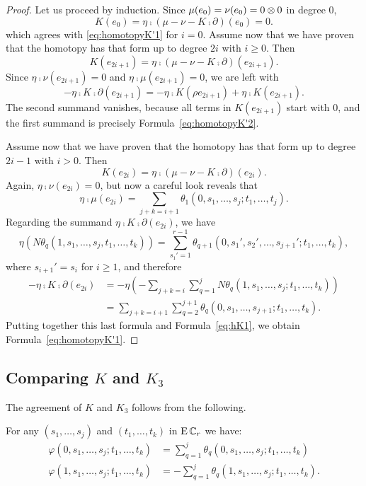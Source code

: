 \begin{proof}
 	Let us proceed by induction.
	Since $\mu(e_0) = \nu(e_0) = 0\otimes 0$ in degree $0$,
	\[
	K(e_0) = \eta \comp (\mu-\nu-K \comp \partial)(e_0) = 0.
	\]
	which agrees with \eqref{eq:homotopyK'1} for $i=0$.
	Assume now that we have proven that the homotopy has that form up to degree $2i$ with $i\geq 0$.
	Then
	\[K(e_{2i+1}) = \eta \comp (\mu-\nu-K \comp \partial)(e_{2i+1}).\]
	Since $\eta \comp \nu(e_{2i+1}) = 0$ and $\eta \comp \mu(e_{2i+1}) = 0$, we are left with
	\[-\eta \comp K \comp \partial(e_{2i+1}) = -\eta \comp K (\rho e_{2i+1}) + \eta \comp K (e_{2i+1}).
	\]
	The second summand vanishes, because all terms in $K(e_{2i+1})$ start with $0$, and the first summand is precisely Formula~\eqref{eq:homotopyK'2}.

	Assume now that we have proven that the homotopy has that form up to degree $2i-1$ with $i>0$.
	Then
	\[K(e_{2i}) = \eta \comp (\mu-\nu-K \comp \partial)(e_{2i}).\]
	Again, $\eta \comp \nu(e_{2i}) = 0$, but now a careful look reveals that
	\begin{equation}\label{eq:hK1}
		\eta \comp \mu(e_{2i}) = \sum_{j+k=i+1}\theta_1(0,s_1,\dots,s_j;t_1,\dots,t_j).
	\end{equation}
	Regarding the summand $\eta \comp K \comp \partial(e_{2i})$, we have
	\[\eta(N\theta_q(1,s_1,\dots,s_j,t_1,\dots,t_k)) = \sum_{s_1' = 1}^{r-1}\theta_{q+1}(0,s_1',s_2',\dots,s_{j+1}';t_1,\dots,t_k),\]
	where $s_{i+1}' = s_i$ for $i\geq 1$, and therefore
	\begin{align*}\label{eq:hK2}
		-\eta \comp K \comp \partial(e_{2i}) &=
		-\eta\left(-\sum_{j+k = i}\sum_{q=1}^j N\theta_q(1,s_1,\dots,s_j;t_1,\dots,t_k)\right) \\ &=
		\sum_{j+k = i+1}\sum_{q=2}^{j+1}\theta_q(0,s_1,\dots,s_{j+1};t_1,\dots,t_k).
	\end{align*}
	Putting together this last formula and Formula~\eqref{eq:hK1}, we obtain Formula~\eqref{eq:homotopyK'1}.
\end{proof}

\subsection{Comparing $K$ and $K_3$}\label{ss:comparins K and K3}

The agreement of $K$ and $K_3$ follows from the following.

\begin{lemma}
	For any $(s_1,\dots,s_j)$ and $(t_1,\dots,t_k)$ in $\operatorname{E}\mathbb{C}_r$ we have:
	\begin{align*}
		\varphi(0,s_1,\dots,s_j;t_1,\dots,t_k) &= \sum_{q=1}^j \theta_q(0,s_1,\dots,s_j;t_1,\dots,t_k) \\
		\varphi(1,s_1,\dots,s_j;t_1,\dots,t_k) &= -\sum_{q=1}^j \theta_q(1,s_1,\dots,s_j;t_1,\dots,t_k).
	\end{align*}
\end{lemma}

